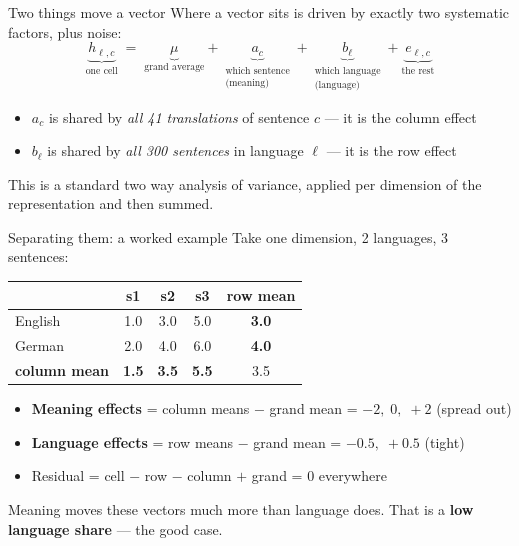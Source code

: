 \documentclass[aspectratio=169,11pt]{beamer}
\newcommand{\Hi}[1]{{\color{acc}\textbf{#1}}}
\begin{document}
\begin{frame}{Two things move a vector}
Where a vector sits is driven by exactly two systematic factors, plus
noise:
\vspace{8pt}
\[
\underbrace{h_{\ell,c}}_{\text{one cell}} \;=\;
\underbrace{\mu}_{\text{grand average}} +
\underbrace{a_c}_{\substack{\text{which sentence}\\ \text{(meaning)}}} +
\underbrace{b_\ell}_{\substack{\text{which language}\\ \text{(language)}}} +
\underbrace{e_{\ell,c}}_{\text{the rest}}
\]
\vspace{8pt}
\begin{itemize}\setlength\itemsep{5pt}
\item $a_c$ is shared by \emph{all 41 translations} of sentence $c$ ---
it is the column effect
\item $b_\ell$ is shared by \emph{all 300 sentences} in language
$\ell$ --- it is the row effect
\end{itemize}
\vspace{8pt}
{\color{mut}This is a standard two way analysis of variance, applied
per dimension of the representation and then summed.}
\end{frame}

\begin{frame}{Separating them: a worked example}
Take one dimension, 2 languages, 3 sentences:
\vspace{4pt}
\begin{center}\small
\begin{tabular}{l|ccc|c}
 & s1 & s2 & s3 & \textbf{row mean}\\
\hline
English & 1.0 & 3.0 & 5.0 & \textbf{3.0}\\
German  & 2.0 & 4.0 & 6.0 & \textbf{4.0}\\
\hline
\textbf{column mean} & \textbf{1.5} & \textbf{3.5} & \textbf{5.5} &
3.5\\
\end{tabular}
\end{center}
\vspace{8pt}
\begin{itemize}\setlength\itemsep{4pt}
\item \Hi{Meaning effects} = column means $-$ grand mean =
$-2,\; 0,\; +2$ \quad(spread out)
\item \Hi{Language effects} = row means $-$ grand mean =
$-0.5,\; +0.5$ \quad(tight)
\item Residual = cell $-$ row $-$ column $+$ grand = $0$ everywhere
\end{itemize}
\vspace{8pt}
Meaning moves these vectors much more than language does. That is a
\Hi{low language share} --- the good case.
\end{frame}
\end{document}
